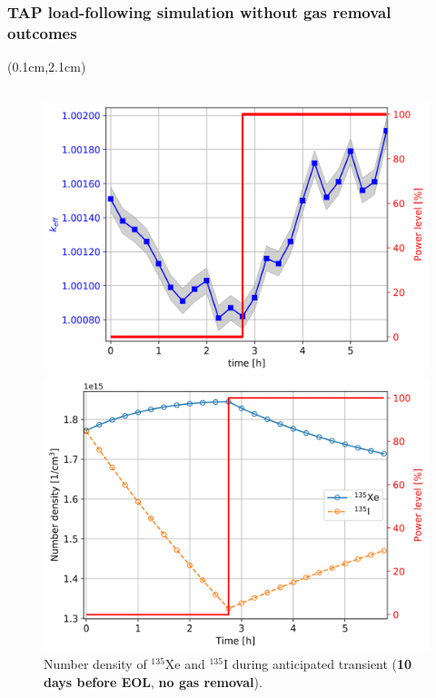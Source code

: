 \begin{frame}
\frametitle{TAP load-following simulation without gas removal outcomes}
\begin{textblock*}{12.5cm}(0.1cm,2.1cm) %
\begin{columns}
	\column[t]{6.3cm}
	\begin{figure}[t]
		\begin{overprint}
	\includegraphics[width=1.11\linewidth]{../dissertation/figures/ch5/keff_kl_1_eol_eoc_15min.png}
		\vspace{-6mm}
	\caption{$k_{eff}$ dynamics during 2.75-hour shutdown (\textbf{10 days 
		before EOL}, \textbf{no gas removal}). $\sigma\pm7$ $pcm$ is shaded.}
	\includegraphics[width=1.11\linewidth]{../dissertation/figures/ch5/xe_i_kl_1_eol_eoc_15min.png}
		\vspace{-6mm}
	\caption{Number density of $^{135}$Xe and $^{135}$I during anticipated 
	transient (\textbf{10 days before EOL}, \textbf{no gas removal}).}
		\end{overprint}
	\end{figure}
	

\end{columns}
\end{textblock*}
\end{frame}
